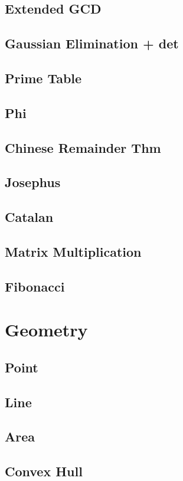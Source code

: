     \subsection{Extended GCD}
        
    \subsection{Gaussian Elimination + det}
        
    \subsection{Prime Table}
        
    \subsection{Phi}
        
    \subsection{Chinese Remainder Thm}
        
    \subsection{Josephus}
        
    \subsection{Catalan}
        
    \subsection{Matrix Multiplication}
        
    \subsection{Fibonacci}
        

\section{Geometry}
    \subsection{Point}
        
    \subsection{Line}
        
    \subsection{Area}
        
    \subsection{Convex Hull}
        